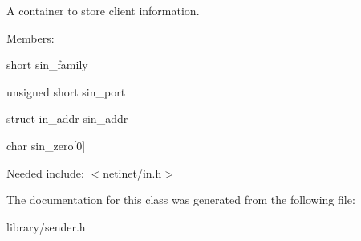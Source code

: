 A container to store client information. 

Members\+:
\begin{DoxyItemize}
\item {\ttfamily short} sin\+\_\+family
\item {\ttfamily unsigned short} sin\+\_\+port
\item {\ttfamily struct} in\+\_\+addr sin\+\_\+addr
\item {\ttfamily char} sin\+\_\+zero\mbox{[}0\mbox{]}
\end{DoxyItemize}

Needed include\+: {\ttfamily $<$netinet/in.\+h$>$} 

The documentation for this class was generated from the following file\+:\begin{DoxyCompactItemize}
\item 
library/sender.\+h\end{DoxyCompactItemize}
